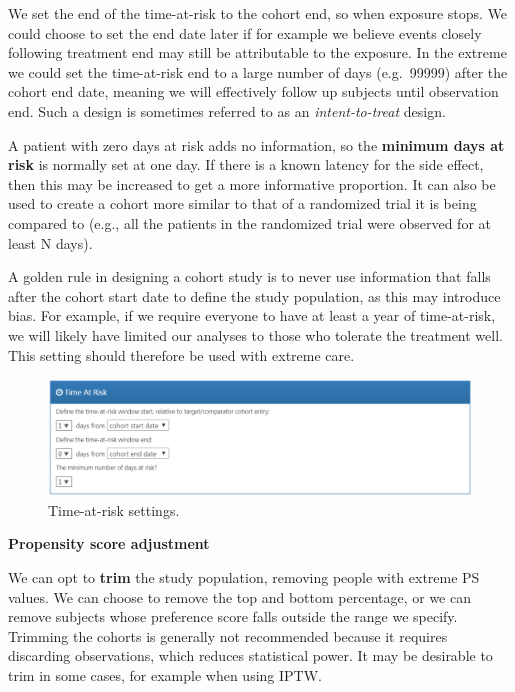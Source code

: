 \documentclass[]{book}
\begin{document}
We set the end of the time-at-risk to the cohort end, so when exposure stops. We could choose to set the end date later if for example we believe events closely following treatment end may still be attributable to the exposure. In the extreme we could set the time-at-risk end to a large number of days (e.g.~99999) after the cohort end date, meaning we will effectively follow up subjects until observation end. Such a design is sometimes referred to as an \emph{intent-to-treat} design.

A patient with zero days at risk adds no information, so the \textbf{minimum days at risk} is normally set at one day. If there is a known latency for the side effect, then this may be increased to get a more informative proportion. It can also be used to create a cohort more similar to that of a randomized trial it is being compared to (e.g., all the patients in the randomized trial were observed for at least N days).

A golden rule in designing a cohort study is to never use information that falls after the cohort start date to define the study population, as this may introduce bias. For example, if we require everyone to have at least a year of time-at-risk, we will likely have limited our analyses to those who tolerate the treatment well. This setting should therefore be used with extreme care.

\begin{figure}

{\centering \includegraphics[width=1\linewidth]{images/PopulationLevelEstimation/timeAtRisk} 

}

\caption{Time-at-risk settings.}\label{fig:timeAtRisk}
\end{figure}

\textbf{Propensity score adjustment}

We can opt to \textbf{trim} the study population, removing people with extreme PS values. We can choose to remove the top and bottom percentage, or we can remove subjects whose preference score falls outside the range we specify. Trimming the cohorts is generally not recommended because it requires discarding observations, which reduces statistical power. It may be desirable to trim in some cases, for example when using IPTW. 
\end{document}
